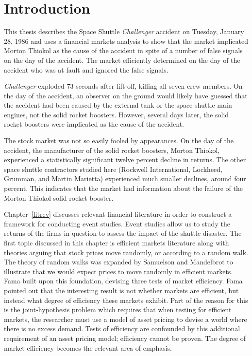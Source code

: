   \chapter{Introduction}

This thesis describes the Space Shuttle {\em Challenger} accident on Tuesday, January 28, 1986 and uses a financial markets analysis to show that the market implicated Morton Thiokol as the cause of the accident in spite of a number of false signals on the day of the accident. The market efficiently determined on the day of the accident who was at fault and ignored the false signals.

{\em Challenger} exploded 73 seconds after lift-off, killing all seven crew members. On the day of the accident, an observer on the ground would likely have guessed that the accident had been caused by the external tank or the space shuttle main engines, not the solid rocket boosters. However, several days later, the solid rocket boosters were implicated as the cause of the accident.

The stock market was not so easily fooled by appearances. On the day of the accident, the manufacturer of the solid rocket boosters, Morton Thiokol, experienced a statistically significant twelve percent decline in returns. The other space shuttle contractors studied here (Rockwell International, Lockheed, Grumman, and Martin Marietta) experienced much smaller declines, around four percent. This indicates that the market had information about the failure of the Morton Thiokol solid rocket booster.

Chapter~\ref{litrev} discusses relevant financial literature in order to construct a framework for conducting event studies. Event studies allow us to study the returns of the firms in question to assess the impact of the shuttle disaster. The first topic discussed in this chapter is efficient markets literature along with theories arguing that stock prices move randomly, or according to a random walk. The theory of random walks was expanded by Samuelson and Mandelbrot to illustrate that we would expect prices to move randomly in efficient markets. Fama built upon this foundation, devising three tests of market efficiency. Fama pointed out that the interesting result is not whether markets are efficient, but instead what degree of efficiency these markets exhibit. Part of the reason for this is the joint-hypothesis problem which requires that when testing for efficient markets, the researcher must use a model of asset pricing to devise a world where there is no excess demand. Tests of efficiency are confounded by this additional requirement of an asset pricing model; efficiency cannot be proven. The degree of market efficiency becomes the relevant area of emphasis.

